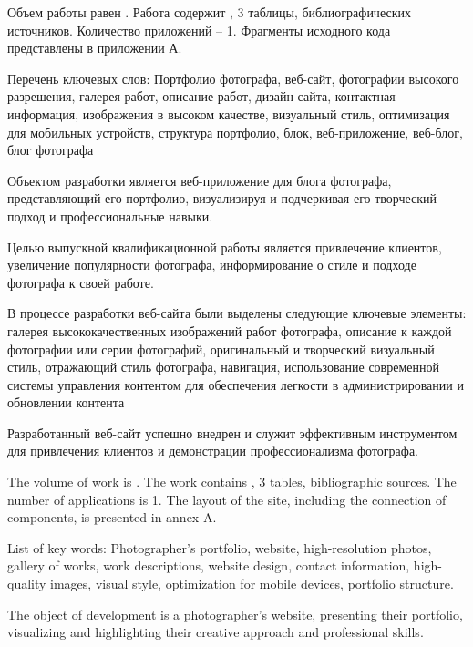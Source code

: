 
Объем работы равен . Работа содержит , 3 таблицы,  библиографических источников. Количество приложений – 1. Фрагменты исходного кода представлены в приложении А.

Перечень ключевых слов: Портфолио фотографа, веб-сайт, фотографии высокого разрешения, галерея работ, описание работ, дизайн сайта, контактная информация, изображения в высоком качестве, визуальный стиль, оптимизация для мобильных устройств, структура портфолио, блок, веб-приложение, веб-блог, блог фотографа

Объектом разработки является веб-приложение для блога фотографа, представляющий его портфолио, визуализируя и подчеркивая его творческий подход и профессиональные навыки.

Целью выпускной квалификационной работы является привлечение клиентов, увеличение популярности фотографа, информирование о стиле и подходе фотографа к своей работе.

В процессе разработки веб-сайта были выделены следующие ключевые элементы: галерея высококачественных изображений работ фотографа, описание к каждой фотографии или серии фотографий, оригинальный и творческий визуальный стиль, отражающий стиль фотографа, навигация, использование современной системы управления контентом для обеспечения легкости в администрировании и обновлении контента

Разработанный веб-сайт успешно внедрен и служит эффективным инструментом для привлечения клиентов и демонстрации профессионализма фотографа.

  
The volume of work is . The work contains , 3 tables,  bibliographic sources. The number of applications is 1. The layout of the site, including the connection of components, is presented in annex A.

List of key words: Photographer's portfolio, website, high-resolution photos, gallery of works, work descriptions, website design, contact information, high-quality images, visual style, optimization for mobile devices, portfolio structure.


The object of development is a photographer's website, presenting their portfolio, visualizing and highlighting their creative approach and professional skills.

